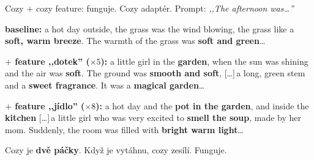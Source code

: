 \documentclass[aspectratio=169,10pt]{beamer}
\newcommand{\qlabel}[1]{{\normalfont\bfseries\color{accBlack}#1}}
\begin{document}
\begin{frame}[t]{Cozy $+$ cozy feature: funguje.}
  \vspace{2mm}
  {\small Cozy adaptér. Prompt: \emph{,,The afternoon was\ldots''}}\par\vspace{2mm}
  {\scriptsize
  \begin{quotebox}
    \qlabel{baseline:} a hot day outside, the grass was the wind blowing, the grass like a \textbf{soft, warm breeze}. The warmth of the grass was \textbf{soft and green}\ldots
  \end{quotebox}
  \begin{quotebox}[featAmber!12]
    \qlabel{$+$ feature ,,dotek'' ($\times 5$):} a little girl in the \textbf{garden}, when the sun was shining and the air was \textbf{soft}. The ground was \textbf{smooth and soft}, [\ldots]\,a long, green stem and a \textbf{sweet fragrance}. It was a \textbf{magical garden}\ldots
  \end{quotebox}
  \begin{quotebox}[accGreen!12]
    \qlabel{$+$ feature ,,jídlo'' ($\times 8$):} a hot day and the \textbf{pot in the garden}, and inside the \textbf{kitchen} [\ldots]\,a little girl who was very excited to \textbf{smell the soup}, made by her mom. Suddenly, the room was filled with \textbf{bright warm light}\ldots
  \end{quotebox}
  }
  \vspace{2mm}
  \begin{aha}
    \small Cozy je \textbf{dvě páčky}. Když je vytáhnu, cozy zesílí. Funguje.
  \end{aha}
\end{frame}


\end{document}
